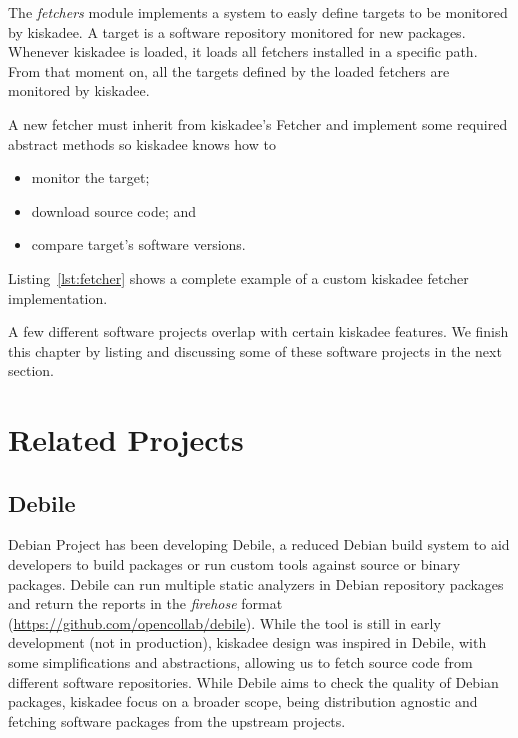 The \emph{fetchers} module implements a system to easly define targets to be
monitored by kiskadee. A target is a software repository monitored for new
packages. Whenever kiskadee is loaded, it loads all fetchers installed in a
specific path. From that moment on, all the targets defined by the loaded
fetchers are monitored by kiskadee.

A new fetcher must inherit from kiskadee's Fetcher and implement some required
abstract methods so kiskadee knows how to
\begin{itemize}
  \item monitor the target;
  \item download source code; and
  \item compare target's software versions.
\end{itemize}

Listing~\ref{lst:fetcher} shows a complete example of a custom kiskadee fetcher implementation.

\begin{minipage}{\linewidth}

\end{minipage}

A few different software projects overlap with certain kiskadee features. We
finish this chapter by listing and discussing some of these software projects
in the next section.

\section{Related Projects}
\label{sec:related_projects}

\subsection{Debile}

Debian Project has been developing Debile, a reduced Debian build system to aid
developers to build packages or run custom tools against source or binary
packages.  Debile can run multiple static analyzers in Debian repository
packages and return the reports in the \textit{firehose}
format (\url{https://github.com/opencollab/debile}). While the tool is
still in early development (not in production), kiskadee design was inspired in
Debile, with some simplifications and abstractions, allowing us to fetch source
code from different software repositories. While Debile aims to check the
quality of Debian packages, kiskadee focus on a broader scope, being
distribution agnostic and fetching software packages from the upstream projects.

